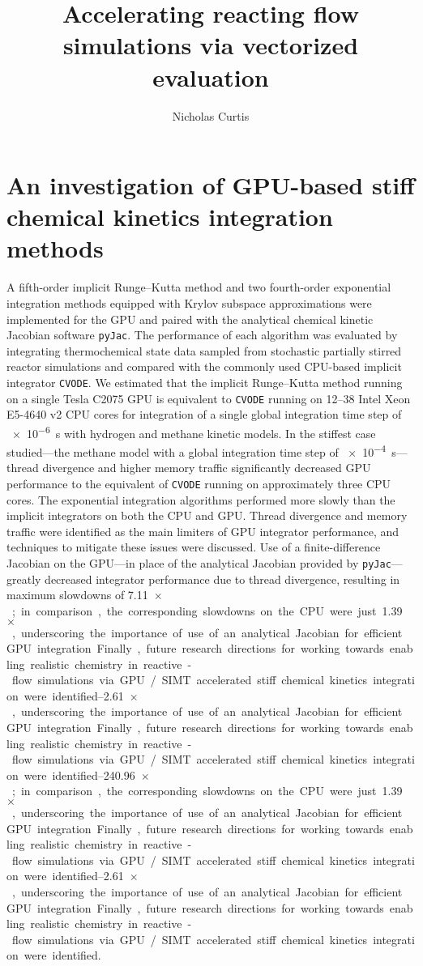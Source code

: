 \documentclass[a4paper,10pt]{article}
\title{Accelerating reacting flow simulations via vectorized evaluation}
\author{Nicholas Curtis}
\begin{document}
\maketitle

\section{An investigation of GPU-based stiff chemical kinetics integration methods}
A fifth-order implicit Runge--Kutta method and two fourth-order exponential integration methods equipped with Krylov subspace approximations were implemented for the GPU and paired with the analytical chemical kinetic Jacobian software \texttt{pyJac}.
The performance of each algorithm was evaluated by integrating thermochemical state data sampled from stochastic partially stirred reactor simulations and compared with the commonly used CPU-based implicit integrator \texttt{CVODE}.
We estimated that the implicit Runge--Kutta method running on a single Tesla C2075 GPU is equivalent to \texttt{CVODE} running on \numrange{12}{38} Intel Xeon E5-4640 v2 CPU cores for integration of a single global integration time step of \SI{e-6}{\second} with hydrogen and methane kinetic models.
In the stiffest case studied---the methane model with a global integration time step of \SI{e-4}{\second}---thread divergence and higher memory traffic significantly decreased GPU performance to the equivalent of \texttt{CVODE} running on approximately three CPU cores.
The exponential integration algorithms performed more slowly than the implicit integrators on both the CPU and GPU.
Thread divergence and memory traffic were identified as the main limiters of GPU integrator performance, and techniques to mitigate these issues were discussed.
Use of a finite-difference Jacobian on the GPU---in place of the analytical Jacobian provided by \texttt{pyJac}---greatly decreased integrator performance due to thread divergence, resulting in maximum slowdowns of \SIrange{7.11}{240.96}{$\times$}; in comparison, the corresponding slowdowns on the CPU were just \SIrange{1.39}{2.61}{$\times$}, underscoring the importance of use of an analytical Jacobian for efficient GPU integration.
Finally, future research directions for working towards enabling realistic chemistry in reactive-flow simulations via GPU\slash SIMT accelerated stiff chemical kinetics integration were identified.
\end{document}

